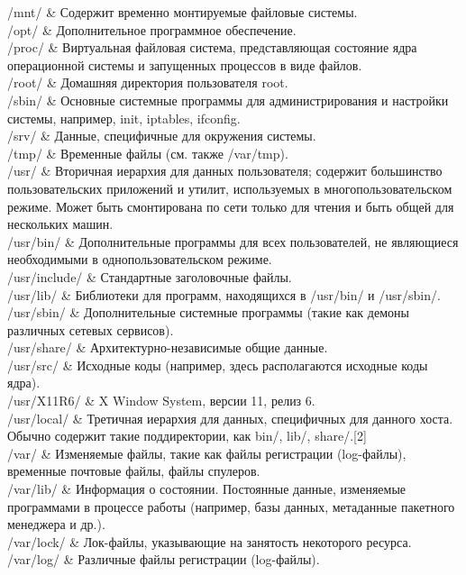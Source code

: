 \begin{center}
/mnt/ \& 	Содержит временно монтируемые файловые системы. \\
/opt/ \& 	Дополнительное программное обеспечение. \\
/proc/ \& 	Виртуальная файловая система, представляющая состояние ядра операционной системы и запущенных процессов в виде файлов. \\
/root/ \& 	Домашняя директория пользователя root. \\
/sbin/ \& 	Основные системные программы для администрирования и настройки системы, например, init, iptables, ifconfig. \\
/srv/ \&	Данные, специфичные для окружения системы. \\
/tmp/ \&	Временные файлы (см. также /var/tmp). \\
/usr/ \&	Вторичная иерархия для данных пользователя; содержит большинство пользовательских приложений и утилит, используемых в многопользовательском режиме. Может быть смонтирована по сети только для чтения и быть общей для нескольких машин. \\
/usr/bin/ \& Дополнительные программы для всех пользователей, не являющиеся необходимыми в однопользовательском режиме. \\
/usr/include/ \& Стандартные заголовочные файлы. \\
/usr/lib/ \& Библиотеки для программ, находящихся в /usr/bin/ и /usr/sbin/. \\
/usr/sbin/ \& Дополнительные системные программы (такие как демоны различных сетевых сервисов). \\
/usr/share/ \& Архитектурно-независимые общие данные. \\
/usr/src/ \& Исходные коды (например, здесь располагаются исходные коды ядра). \\
/usr/X11R6/ \& X Window System, версии 11, релиз 6. \\
/usr/local/ \&	Третичная иерархия для данных, специфичных для данного хоста. Обычно содержит такие поддиректории, как bin/, lib/, share/.[2] \\
/var/ \& 	Изменяемые файлы, такие как файлы регистрации (log-файлы), временные почтовые файлы, файлы спулеров. \\
/var/lib/ \&	Информация о состоянии. Постоянные данные, изменяемые программами в процессе работы (например, базы данных, метаданные пакетного менеджера и др.). \\
/var/lock/ \&	Лок-файлы, указывающие на занятость некоторого ресурса. \\
/var/log/ \&	Различные файлы регистрации (log-файлы). \\

\end{center}
